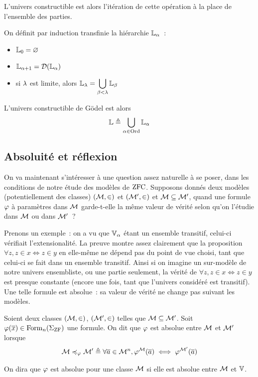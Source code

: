 L'univers constructible est alors l'itération de cette opération à la place de
l'ensemble des parties.

\begin{definition}\label{def.L}
  On définit par induction transfinie la hiérarchie $\mathbb L_{\alpha}$~:
  \begin{itemize}
  \item $\mathbb L_0 = \varnothing$
  \item $\mathbb L_{\alpha + 1} = \mathcal{D} (\mathbb L_{\alpha})$
  \item si $\lambda$ est limite, alors
    $\displaystyle\mathbb L_\lambda = \bigcup_{\beta < \lambda} \mathbb L_\beta$
  \end{itemize}
  L'univers constructible de Gödel est alors
  \[\mathbb L \triangleq \bigcup_{\alpha \in \operatorname{Ord}} \mathbb L_\alpha\]
\end{definition}

\subsection{Absoluité et réflexion}

On va maintenant s'intéresser à une question assez naturelle à se poser, dans
les conditions de notre étude des modèles de $\operatorname{ZFC}$. Supposons donnés deux
modèles (potentiellement des classes) $(\mathcal{M},\in)$ et $(\mathcal{M}',\in)$
et $\mathcal{M} \subseteq \mathcal{M}'$, quand une formule $\varphi$ à paramètres dans
$\mathcal{M}$ garde-t-elle la même valeur de vérité selon qu'on l'étudie dans
$\mathcal{M}$ ou dans $\mathcal{M}'$~?

Prenons un exemple~: on a vu que $\mathbb V_{\alpha}$ étant un ensemble transitif, celui-ci
vérifiait l'extensionalité. La preuve montre assez clairement que la proposition
$\forall z, z \in x \iff z \in y$ en elle-même ne dépend pas du point de vue
choisi, tant que celui-ci se fait dans un ensemble transitif. Ainsi si on
imagine un sur-modèle de notre univers ensembliste, ou une partie seulement, la
vérité de $\forall z, z \in x \iff z \in y$ est presque constante (encore une
fois, tant que l'univers considéré est transitif). Une telle formule est
absolue~: sa valeur de vérité ne change pas suivant les modèles.

\begin{definition}\label{def.absoluite}
  Soient deux classes $(\mathcal{M},\in)$, $(\mathcal{M}',\in)$ telles que
  $\mathcal{M} \subseteq \mathcal{M}'$.
  Soit $\varphi(\overline{x}) \in \operatorname{Form}_n(\Sigma_{\operatorname{ZF}})$ une formule. On dit que
  $\varphi$ est absolue entre $\mathcal{M}$ et $\mathcal{M}'$ lorsque
  \[\mathcal{M} \preccurlyeq_{\varphi} \mathcal{M}' \triangleq
  \forall \overline{a} \in \mathcal{M}^n, \varphi^{\mathcal{M}}(\overline{a})
  \iff \varphi^{\mathcal{M}'}(\overline{a})\]

  On dira que $\varphi$ est absolue pour une classe $\mathcal{M}$ si elle est
  absolue entre $\mathcal{M}$ et $\mathbb V$.
  \index[notation]{$\absolF$}
\end{definition}

